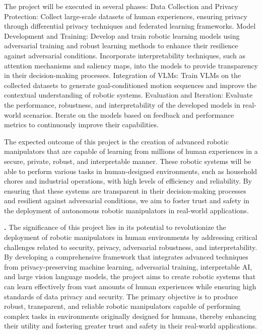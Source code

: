 \documentclass[11pt]{NSF}
\newcommand*\cib[1]{\tikz[baseline=(char.base)]{
                \node[shape=circle,fill=black,text=white,draw,inner sep=0.3pt] (char) {#1};}}
\newcommand{\BfPara}[1]{{\vspace{1ex}\noindent\bfseries\an{#1}.}\xspace}
\begin{document}
The project will be executed in several phases:
\cib{1} Data Collection and Privacy Protection:
Collect large-scale datasets of human experiences, ensuring privacy through differential privacy techniques and federated learning frameworks.
Model Development and Training:
\cib{2} Develop and train robotic learning models using adversarial training and robust learning methods to enhance their resilience against adversarial conditions.
Incorporate interpretability techniques, such as attention mechanisms and saliency maps, into the models to provide transparency in their decision-making processes.
\cib{3} Integration of VLMs:
Train VLMs on the collected datasets to generate goal-conditioned motion sequences and improve the contextual understanding of robotic systems.
\cib{4} Evaluation and Iteration:
Evaluate the performance, robustness, and interpretability of the developed models in real-world scenarios.
Iterate on the models based on feedback and performance metrics to continuously improve their capabilities.

The expected outcome of this project is the creation of advanced robotic manipulators that are capable of learning from millions of human experiences in a secure, private, robust, and interpretable manner. These robotic systems will be able to perform various tasks in human-designed environments, such as household chores and industrial operations, with high levels of efficiency and reliability. By ensuring that these systems are transparent in their decision-making processes and resilient against adversarial conditions, we aim to foster trust and safety in the deployment of autonomous robotic manipulators in real-world applications.


\BfPara{Significance and Objective} 
The significance of this project lies in its potential to revolutionize the deployment of robotic manipulators in human environments by addressing critical challenges related to security, privacy, adversarial robustness, and interpretability. By developing a comprehensive framework that integrates advanced techniques from privacy-preserving machine learning, adversarial training, interpretable AI, and large vision language models, the project aims to create robotic systems that can learn effectively from vast amounts of human experiences while ensuring high standards of data privacy and security. The primary objective is to produce robust, transparent, and reliable robotic manipulators capable of performing complex tasks in environments originally designed for humans, thereby enhancing their utility and fostering greater trust and safety in their real-world applications.
\end{document}
